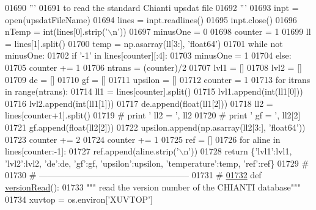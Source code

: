 \begin{DoxyCode}
{{{{{{{{{{{{{{{01690     \textcolor{stringliteral}{'''}
01691 \textcolor{stringliteral}{    to read the standard Chianti upsdat file}
01692 \textcolor{stringliteral}{    '''}
01693     inpt = open(upsdatFileName)
01694     lines = inpt.readlines()
01695     inpt.close()
01696     nTemp = int(lines[0].strip(\textcolor{stringliteral}{'\(\backslash\)n'}))
01697     minusOne = 0
01698     counter = 1
01699     ll = lines[1].split()
01700     temp = np.asarray(ll[3:], \textcolor{stringliteral}{'float64'})
01701     \textcolor{keywordflow}{while} \textcolor{keywordflow}{not} minusOne:
01702         \textcolor{keywordflow}{if} \textcolor{stringliteral}{'-1'} \textcolor{keywordflow}{in} lines[counter][:4]:
01703             minusOne = 1
01704         \textcolor{keywordflow}{else}:
01705             counter += 1
01706     ntrans = (counter)/2
01707     lvl1 = []
01708     lvl2 = []
01709     de = []
01710     gf = []
01711     upsilon = []
01712     counter = 1
01713     \textcolor{keywordflow}{for} itrans \textcolor{keywordflow}{in} range(ntrans):
01714         ll1 = lines[counter].split()
01715         lvl1.append(int(ll1[0]))
01716         lvl2.append(int(ll1[1]))
01717         de.append(float(ll1[2]))
01718         ll2 = lines[counter+1].split()
01719 \textcolor{comment}{#        print ' ll2 = ', ll2}
01720 \textcolor{comment}{#        print ' gf = ', ll2[2]}
01721         gf.append(float(ll2[2]))
01722         upsilon.append(np.asarray(ll2[3:], \textcolor{stringliteral}{'float64'}))
01723         counter += 2
01724     counter += 1
01725     ref = []
01726     \textcolor{keywordflow}{for} aline \textcolor{keywordflow}{in} lines[counter:-1]:
01727         ref.append(aline.strip(\textcolor{stringliteral}{'\(\backslash\)n'}))
01728     \textcolor{keywordflow}{return} \{\textcolor{stringliteral}{'lvl1'}:lvl1, \textcolor{stringliteral}{'lvl2'}:lvl2, \textcolor{stringliteral}{'de'}:de, \textcolor{stringliteral}{'gf'}:gf, \textcolor{stringliteral}{'upsilon'}:upsilon, \textcolor{stringliteral}{'temperature'}:temp, \textcolor{stringliteral}{'ref'}:ref\}
01729     \textcolor{comment}{#}
01730     \textcolor{comment}{# -----------------------------------------------------}
01731     \textcolor{comment}{#}
\hypertarget{__chianti__tools_8py_source_l01732}{}\hyperlink{namespacepyneb_1_1utils_1_1__chianti__tools_a349618b1b79ca902de8a030592d6d43a}{01732} \textcolor{keyword}{def }\hyperlink{namespacepyneb_1_1utils_1_1__chianti__tools_a349618b1b79ca902de8a030592d6d43a}{versionRead}():
01733     \textcolor{stringliteral}{""" read the version number of the CHIANTI database"""}
01734     xuvtop = os.environ[\textcolor{stringliteral}{'XUVTOP'}]
}}}}}}}}}}}}}}}
\end{DoxyCode}
